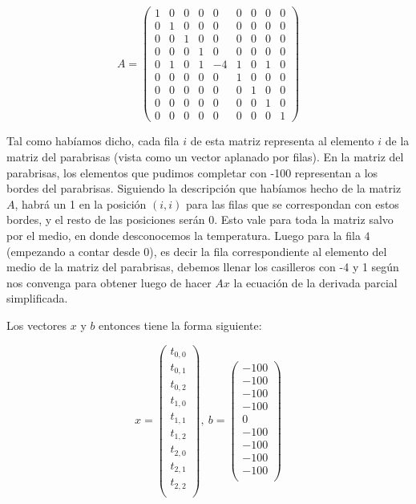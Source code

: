 \vspace{\baselineskip}

\[A = \left( \begin{array}{ccccccccc}
1 & 0 & 0 & 0 & 0 & 0 & 0 & 0 & 0 \\
0 & 1 & 0 & 0 & 0 & 0 & 0 & 0 & 0 \\
0 & 0 & 1 & 0 & 0 & 0 & 0 & 0 & 0 \\ 
0 & 0 & 0 & 1 & 0 & 0 & 0 & 0 & 0 \\
0 & 1 & 0 & 1 & -4 & 1 & 0 & 1 & 0 \\
0 & 0 & 0 & 0 & 0 & 1 & 0 & 0 & 0 \\ 
0 & 0 & 0 & 0 & 0 & 0 & 1 & 0 & 0 \\
0 & 0 & 0 & 0 & 0 & 0 & 0 & 1 & 0 \\
0 & 0 & 0 & 0 & 0 & 0 & 0 & 0 & 1
\end{array} \right)\] 

\vspace{\baselineskip}

Tal como habíamos dicho, cada fila $i$ de esta matriz representa al elemento $i$ de la matriz del parabrisas (vista como un vector aplanado por filas). En la matriz del parabrisas, los elementos que pudimos completar con -100 representan a los bordes del parabrisas. Siguiendo la descripción que habíamos hecho de la matriz $A$, habrá un 1 en la posición $(i,i)$ para las filas que se correspondan con estos bordes, y el resto de las posiciones serán 0. Esto vale para toda la matriz salvo por el medio, en donde desconocemos la temperatura. Luego para la fila $4$ (empezando a contar desde 0), es decir la fila correspondiente al elemento del medio de la matriz del parabrisas, debemos llenar los casilleros con -4 y 1 según nos convenga para obtener luego de hacer $Ax$ la ecuación de la derivada parcial simplificada.

Los vectores $x$ y $b$ entonces tiene la forma siguiente:

\[ x =  \left( \begin{array}{c}
t_{0,0} \\
t_{0,1} \\
t_{0,2} \\
t_{1,0} \\
t_{1,1} \\
t_{1,2} \\
t_{2,0} \\
t_{2,1} \\
t_{2,2} \\
\end{array} \right), \  b = \left( \begin{array}{c}
-100 \\
-100 \\
-100 \\
-100 \\
0 \\
-100 \\
-100 \\
-100 \\
-100 \\
\end{array} \right)
\] 

